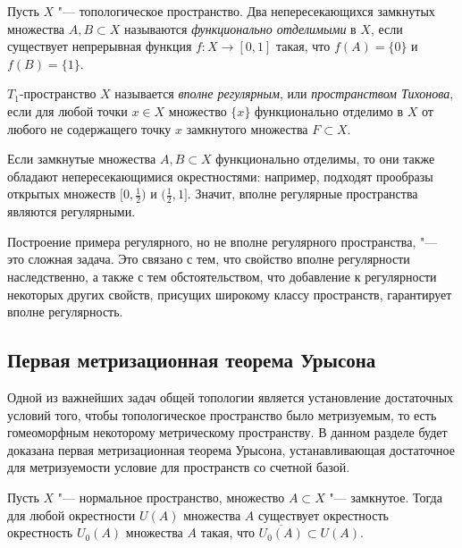 \begin{definition}
    Пусть $X$ "--- топологическое пространство. Два непересекающихся замкнутых множества $A, B \subset X$ называются \textit{функционально отделимыми} в $X$, если существует непрерывная функция $f : X\rightarrow [0, 1]$ такая, что $f(A) = \{0\}$ и $f(B) = \{1\}$.
\end{definition}

\begin{definition}
    $T_1$-пространство $X$ называется \textit{вполне регулярным}, или \textit{пространством Тихонова}, если для любой точки $x \in X$ множество $\{x\}$ функционально отделимо в $X$ от любого не содержащего точку $x$ замкнутого множества $F \subset X$.
\end{definition}

\begin{note}
    Если замкнутые множества $A, B \subset X$ функционально отделимы, то они также обладают непересекающимися окрестностями: например, подходят прообразы открытых множеств $[0, \frac 12)$ и $(\frac12, 1]$. Значит, вполне регулярные пространства являются регулярными.
\end{note}

\begin{note}
    Построение примера регулярного, но не вполне регулярного пространства, "--- это сложная задача. Это связано с тем, что свойство вполне регулярности наследственно, а также с тем обстоятельством, что добавление к регулярности некоторых других свойств, присущих широкому классу пространств, гарантирует вполне регулярность.
\end{note}

\subsection{Первая метризационная теорема Урысона}

\begin{note}
    Одной из важнейших задач общей топологии является установление достаточных условий того, чтобы топологическое пространство было метризуемым, то есть гомеоморфным некоторому метрическому пространству. В данном разделе будет доказана первая метризационная теорема Урысона, устанавливающая достаточное для метризуемости условие для пространств со счетной базой.
\end{note}

\begin{proposition}
    Пусть $X$ "--- нормальное пространство, множество $A \subset X$ "--- замкнутое. Тогда для любой окрестности $U(A)$ множества $A$ существует окрестность окрестность $U_0(A)$ множества $A$ такая, что $\overline{U_0(A)} \subset U(A)$.
\end{proposition}

